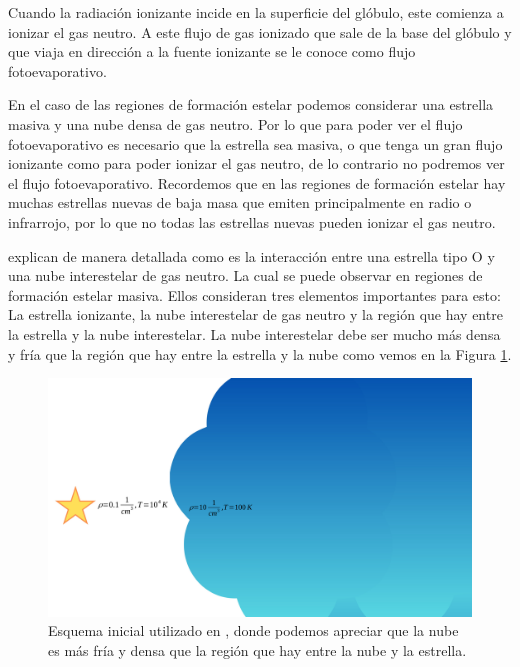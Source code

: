 \documentclass{book}
\begin{document}
Cuando la radiación ionizante incide en la superficie del glóbulo, este comienza a ionizar el gas neutro. A este flujo de gas ionizado que sale de la base del glóbulo y que viaja en dirección a la fuente ionizante se le conoce como flujo fotoevaporativo. 

En el caso de las regiones de formación estelar podemos considerar una estrella masiva y una nube densa de gas neutro. Por lo que para poder ver el flujo fotoevaporativo es necesario que la estrella sea masiva, o que tenga un gran flujo ionizante como para poder ionizar el gas neutro, de lo contrario no podremos ver el flujo fotoevaporativo. Recordemos que en las regiones de formación estelar hay muchas estrellas nuevas de baja masa que emiten principalmente en radio o infrarrojo, por lo que no todas las estrellas nuevas pueden ionizar el gas neutro.

\cite{OortySpitzer_1955} explican de manera detallada como es la interacción entre una estrella tipo O y una nube interestelar de gas neutro. La cual se puede observar en regiones de formación estelar masiva. Ellos consideran tres elementos importantes para esto: La estrella ionizante, la nube interestelar de gas neutro y la región que hay entre la estrella y la nube interestelar. La nube interestelar debe ser mucho más densa y fría que la región que hay entre la estrella y la nube como vemos en la Figura \ref{kahn_zones}.

\begin{figure}[htb]
    \centering
    \includegraphics[width= \textwidth]{artesanales/ImgFi01-5.pdf}
    \caption{Esquema inicial utilizado en \cite{OortySpitzer_1955}, donde podemos apreciar que la nube es más fría y densa que la región que hay entre la nube y la estrella.}
    \label{kahn_zones}
\end{figure}
\end{document}
